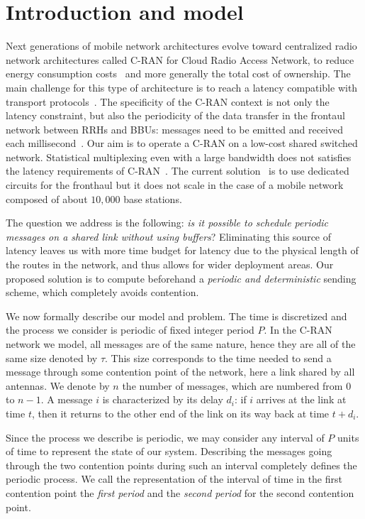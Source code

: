 \documentclass[10pt, conference, letterpaper]{algotel}
\begin{document}
\section{Introduction and model}

Next generations of mobile network architectures evolve toward centralized radio network architectures called C-RAN for Cloud Radio Access Network, to reduce energy consumption costs~\cite{mobile2011c} and more generally the total cost of ownership. The main challenge for this type of architecture is to reach a latency compatible with transport protocols~\cite{ieeep802}. The specificity of the C-RAN context is not only the latency constraint, but also the periodicity of the data transfer in the frontaul network between RRHs and BBUs: messages need to be emitted and received each millisecond~\cite{bouguen2012lte}. Our aim is to operate a C-RAN on a low-cost shared switched network. Statistical multiplexing even with a large bandwidth does not satisfies the latency requirements of C-RAN~\cite{barth2018deterministic}. The current solution~\cite{tayq2017real} is to use dedicated circuits for the fronthaul but it does not scale in the case of a mobile network composed of about $10,000$ base stations. 

The question we address is the following: \emph{is it possible to schedule periodic messages on a shared link without using buffers}? Eliminating this source of latency leaves us with more time budget for latency due to the physical length of the routes in the network, and thus allows for wider deployment areas. Our proposed solution is to compute beforehand a \emph{periodic and deterministic} sending scheme, which completely avoids contention. 

We now formally describe our model and problem.
The time is discretized and the process we consider is periodic of fixed integer period $P$. In the C-RAN network we model, all messages are of the same nature, hence they are all of the same size denoted by $\tau$. This size corresponds to the time needed to send a message through some contention point of the network, here a link shared by all antennas. We denote by $n$ the number of messages, which are numbered from $0$ to $n-1$. A message $i$ is characterized by its delay $d_i$: if $i$ arrives at the link at time $t$, then it returns to the other end of the link on its way back at time $t + d_i$. 

Since the process we describe is periodic, we may consider any interval of $P$ units of time
to represent the state of our system. Describing the messages going through the two contention points during such an interval completely defines the periodic process. We call the representation of the interval of time in the first contention point the \emph{first period} and the \emph{second period} for the second contention point.
\end{document}
